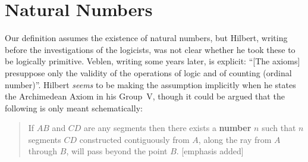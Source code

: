 



\section{Natural Numbers}
Our definition assumes the existence of natural numbers, but Hilbert, writing before the investigations of the logicists, was not clear whether he took these to be logically primitive. Veblen, writing some years later, is explicit: ``[The axioms] presuppose only the validity of the operations of logic and of counting (ordinal number)''. Hilbert \emph{seems} to be making the assumption implicitly when he states the Archimedean Axiom in his Group~V, though it could be argued that the following is only meant schematically:
\begin{quote}
  If $AB$ and $CD$ are any segments then there exists a \textbf{number} $n$ such that $n$ segments $CD$ constructed contiguously from $A$, along the ray from $A$ through $B$, will pass beyond the point $B$.
[emphasis added]\end{quote}

